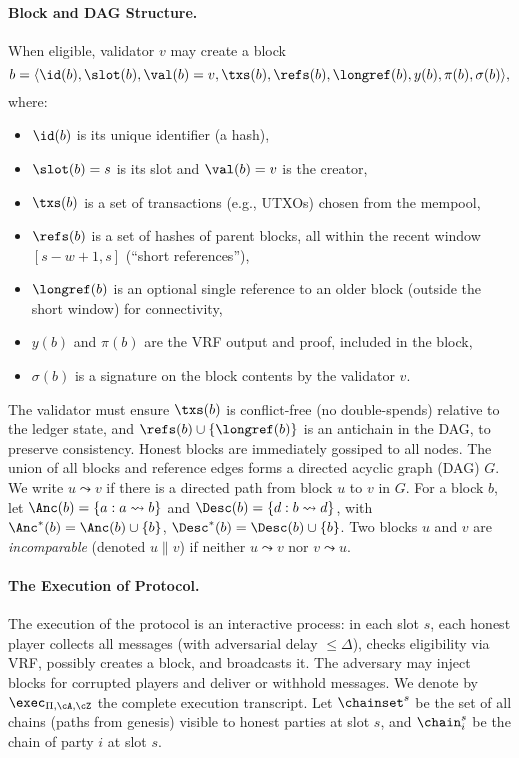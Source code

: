 \paragraph{Block and DAG Structure.} When eligible, validator $v$ may create a block
\begin{equation*}
b = \langle \id(b),\slot(b),\val(b)=v,\txs(b),\refs(b),\longref(b),y(b),\pi(b),\sigma(b)\rangle,
\end{equation*}
where:
\begin{itemize}
  \item $\id(b)$ is its unique identifier (a hash),

  \item $\slot(b)=s$ is its slot and $\val(b)=v$ is the creator,
  \item $\txs(b)$ is a set of transactions (e.g., UTXOs) chosen from the mempool,
  \item $\refs(b)$ is a set of hashes of parent blocks, all within the recent window $[s-w+1,s]$ (“short references”),
  \item $\longref(b)$ is an optional single reference to an older block (outside the short window) for connectivity,
  \item $y(b)$ and $\pi(b)$ are the VRF output and proof, included in the block,
  \item $\sigma(b)$ is a signature on the block contents by the validator $v$.
\end{itemize}
The validator must ensure $\txs(b)$ is conflict-free (no double-spends) relative to the ledger state, and $\refs(b)\cup\{\longref(b)\}$ is an antichain in the DAG, to preserve consistency. Honest blocks are immediately gossiped to all nodes. The union of all blocks and reference edges forms a directed acyclic graph (DAG) $G$. We write $u\leadsto v$ if there is a directed path from block $u$ to $v$ in $G$. For a block $b$, let $\Anc(b)=\{a: a\leadsto b\}$ and $\Desc(b)=\{d: b\leadsto d\}$, with $\Anc^*(b)=\Anc(b)\cup\{b\}$, $\Desc^*(b)=\Desc(b)\cup\{b\}$. Two blocks $u$ and $v$ are {\em incomparable} (denoted $u\parallel v$) if neither $u\leadsto v$ nor $v\leadsto u$.

\paragraph{The Execution of Protocol.} The execution of the protocol is an interactive process: in each slot $s$, each honest player collects all messages (with adversarial delay $\le\Delta$), checks eligibility via VRF, possibly creates a block, and broadcasts it. The adversary may inject blocks for corrupted players and deliver or withhold messages. We denote by $\exec_{\Pi,\cA,\cZ}$ the complete execution transcript. Let $\chainset^s$ be the set of all chains (paths from genesis) visible to honest parties at slot $s$, and $\chain_i^s$ be the chain of party $i$ at slot $s$.

